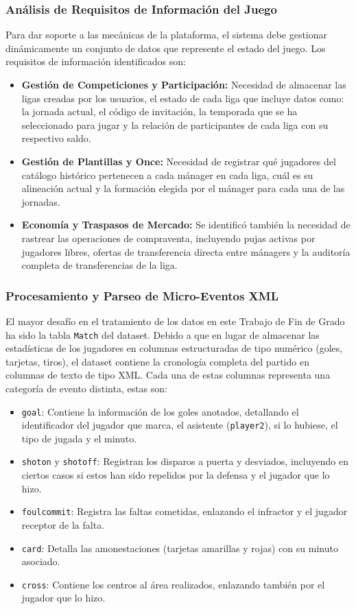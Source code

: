 \subsubsection{Análisis de Requisitos de Información del Juego}
Para dar soporte a las mecánicas de la plataforma, el sistema debe gestionar dinámicamente un conjunto de datos que represente el estado del juego. Los requisitos de información identificados son:
\begin{itemize}
    \item \textbf{Gestión de Competiciones y Participación:} Necesidad de almacenar las ligas creadas por los usuarios, el estado de cada liga que incluye datos como: la jornada actual, el código de invitación, la temporada que se ha seleccionado para jugar y la relación de participantes de cada liga con su respectivo saldo.
    \item \textbf{Gestión de Plantillas y Once:} Necesidad de registrar qué jugadores del catálogo histórico pertenecen a cada mánager en cada liga, cuál es su alineación actual y la formación elegida por el mánager para cada una de las jornadas.
    \item \textbf{Economía y Traspasos de Mercado:} Se identificó también la necesidad de rastrear las operaciones de compraventa, incluyendo pujas activas por jugadores libres, ofertas de transferencia directa entre mánagers y la auditoría completa de transferencias de la liga.
\end{itemize}

\subsubsection{Procesamiento y Parseo de Micro-Eventos XML}
El mayor desafío en el tratamiento de los datos en este Trabajo de Fin de Grado ha sido la tabla \texttt{Match} del dataset. Debido a que en lugar de almacenar las estadísticas de los jugadores en columnas estructuradas de tipo numérico (goles, tarjetas, tiros), el dataset contiene la cronología completa del partido en columnas de texto de tipo XML. Cada una de estas columnas representa una categoría de evento distinta, estas son:
\begin{itemize}
    \item \texttt{goal}: Contiene la información de los goles anotados, detallando el identificador del jugador que marca, el asistente (\texttt{player2}), si lo hubiese, el tipo de jugada y el minuto.
    \item \texttt{shoton} y \texttt{shotoff}: Registran los disparos a puerta y desviados, incluyendo en ciertos casos si estos han sido repelidos por la defensa y el jugador que lo hizo.
    \item \texttt{foulcommit}: Registra las faltas cometidas, enlazando el infractor y el jugador receptor de la falta.
    \item \texttt{card}: Detalla las amonestaciones (tarjetas amarillas y rojas) con su minuto asociado.
    \item \texttt{cross}: Contiene los centros al área realizados, enlazando también por el jugador que lo hizo.
\end{itemize}

